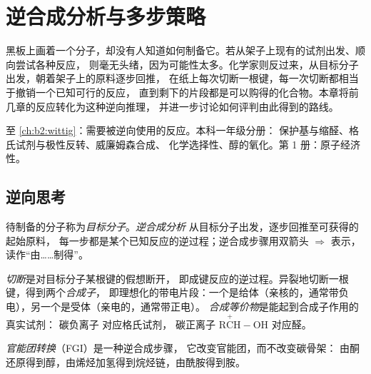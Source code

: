 \chapter{逆合成分析与多步策略}\label{ch:b2:retrosynthesis}

黑板上画着一个分子，却没有人知道如何制备它。若从架子上现有的试剂出发、顺向尝试各种反应，
则毫无头绪，因为可能性太多。化学家则反过来，从目标分子出发，朝着架子上的原料逐步回推，
在纸上每次切断一根键，每一次切断都相当于撤销一个已知可行的反应，
直到剩下的片段都是可以购得的化合物。本章将前几章的反应转化为这种逆向推理，
并进一步讨论如何评判由此得到的路线。

\begin{recall}
 至 \cref{ch:b2:wittig}：需要被逆向使用的反应。本科一年级分册：
保护基与缩醛、格氏试剂与极性反转、威廉姆森合成、
化学选择性、醇的氧化。第 1 册：原子经济性。
\end{recall}

\section{逆向思考}

\begin{definition}[逆合成分析]\label{def:b2:retrosynthesis:analysis}
待制备的分子称为\emph{目标分子}。\emph{逆合成分析}
从目标分子出发，逐步回推至可获得的起始原料，
每一步都是某个已知反应的逆过程；逆合成步骤用双箭头 $\Rightarrow$ 表示，
读作“由……制得”。
\end{definition}

\begin{definition}[切断与合成子]\label{def:b2:retrosynthesis:disconnection}
\emph{切断}是对目标分子某根键的假想断开，
即成键反应的逆过程。异裂地切断一根键，得到两个\emph{合成子}，
即理想化的带电片段：一个是给体（亲核的，通常带负电），另一个是受体（亲电的，通常带正电）。
\emph{合成等价物}是能起到合成子作用的真实试剂：
碳负离子  对应格氏试剂，
碳正离子 $\mathrm{R\overset{+}{C}H{-}OH}$ 对应醛。
\end{definition}

\begin{definition}[官能团转换]\label{def:b2:retrosynthesis:fgi}
\emph{官能团转换}（FGI）是一种逆合成步骤，
它改变官能团，而不改变碳骨架：
由酮还原得到醇，由烯烃加氢得到烷烃链，由酰胺得到胺。
\end{definition}

